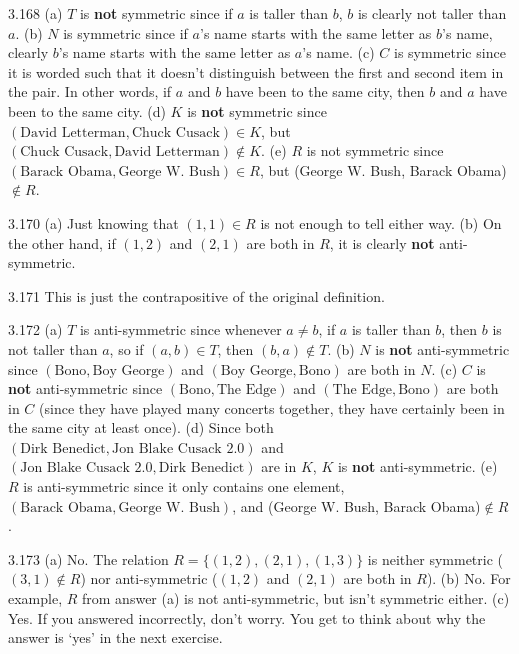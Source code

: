 \begin{Answer}{3.168}
(a) $T$ is {\bf not} symmetric since if $a$ is taller than $b$, $b$ is clearly not taller than $a$.
(b) $N$ is symmetric since if $a$'s name starts with the same letter as $b$'s name, clearly $b$'s name
starts with the same letter as $a$'s name.
(c) $C$ is symmetric since it is worded such that it doesn't distinguish between the first and second
item in the pair.  In other words, if $a$ and $b$ have been to the same city, then $b$ and $a$ have
been to the same city.
(d) $K$ is {\bf not} symmetric since $(\mbox{David Letterman},\mbox{Chuck Cusack})\in K$, but
$(\mbox{Chuck Cusack},\mbox{David Letterman})\not\in K$.
(e) $R$ is not symmetric since $(\mbox{Barack Obama}, \mbox{George W. Bush})\in R$, but
(George W. Bush, Barack Obama)$\not\in R$.
\end{Answer}
\begin{Answer}{3.170}
(a) Just knowing that $(1,1)\in R$ is not enough to tell either way.
(b) On the other hand, if $(1,2)$ and $(2,1)$ are both in $R$, it is clearly
{\bf not} anti-symmetric.
\end{Answer}
\begin{Answer}{3.171}
This is just the contrapositive of the original definition.
\end{Answer}
\begin{Answer}{3.172}
(a) $T$ is anti-symmetric since whenever $a\neq b$, if $a$ is taller than $b$, then $b$ is not taller than $a$,
so if $(a,b)\in T$, then $(b,a)\not\in T$.
(b) $N$ is {\bf not} anti-symmetric since $(\mbox{Bono},\mbox{Boy George})$ and $(\mbox{Boy George},\mbox{Bono})$
are both in $N$.
(c) $C$ is {\bf not} anti-symmetric since $(\mbox{Bono},\mbox{The Edge})$ and $(\mbox{The Edge},\mbox{Bono})$
are both in $C$ (since they have played many concerts together, they have certainly been in the same
city at least once).
(d) Since
both $(\mbox{Dirk Benedict},\mbox{Jon Blake Cusack 2.0})$ and
$(\mbox{Jon Blake Cusack 2.0},\mbox{Dirk Benedict})$ are in $K$,
$K$ is {\bf not} anti-symmetric.
(e) $R$ is anti-symmetric since it only contains one element,
$(\mbox{Barack Obama}, \mbox{George W. Bush})$, and
(George W. Bush, Barack Obama)$\not\in R$.
\end{Answer}
\begin{Answer}{3.173}
(a) No.  The relation $R=\{(1,2),(2,1),(1,3)\}$ is neither symmetric ($(3,1)\not\in R$)
nor anti-symmetric ($(1,2)$ and $(2,1)$ are both in $R$).
(b) No.  For example, $R$ from answer (a) is not anti-symmetric, but isn't symmetric either.
(c) Yes.  If you answered incorrectly, don't worry.  You get to think about why the answer
is `yes' in the next exercise.
\end{Answer}
